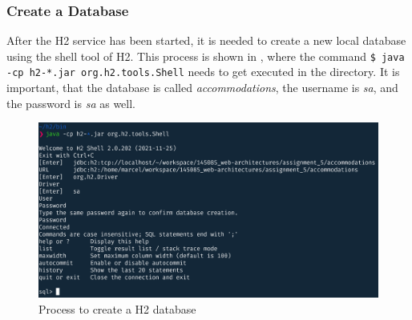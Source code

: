 \subsubsection{Create a Database}\label{sec:03_depl_h2_create}
After the H2 service has been started, it is needed to create a new local database using the shell tool of H2. This process is shown in , where the command \texttt{\$ java -cp h2-*.jar org.h2.tools.Shell} needs to get executed in the  directory. It is important, that the database is called \textit{accommodations}, the username is \textit{sa}, and the password is \textit{sa} as well.
\begin{figure}[h]
\centering
\includegraphics[scale=0.18]{images/03_depl/create-db}
\caption{Process to create a H2 database}
\label{fig:03_depl_createdb_create}
\end{figure}

